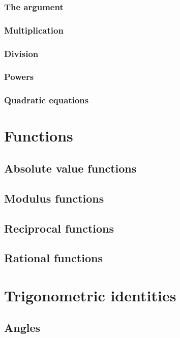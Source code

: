 \documentclass{book}
\begin{document}
\subsection{The argument}

\subsection{Multiplication}

\subsection{Division}

\subsection{Powers}

\subsection{Quadratic equations}

\chapter{Functions}
\section{Absolute value functions}

\section{Modulus functions}

\section{Reciprocal functions}

\section{Rational functions}

\chapter{Trigonometric identities}
\section{Angles}
\end{document}
